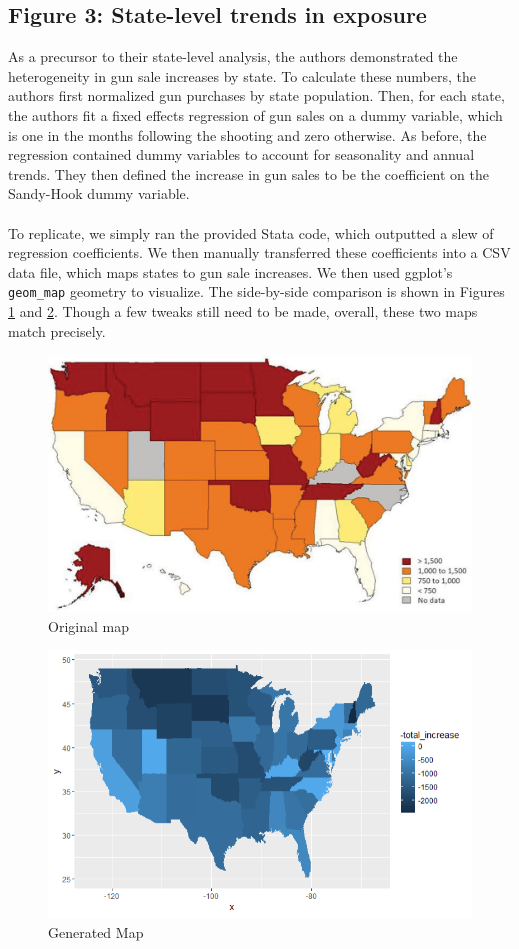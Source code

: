 \documentclass[12pt]{article}%
\begin{document}
\subsection*{Figure 3: State-level trends in exposure}
As a precursor to their state-level analysis, the authors demonstrated the heterogeneity in gun sale increases by state. To calculate these numbers, the authors first normalized gun purchases by state population. Then, for each state, the authors fit a fixed effects regression of gun sales on a dummy variable, which is one in the months following the shooting and zero otherwise. As before, the regression contained dummy variables to account for seasonality and annual trends. They then defined the increase in gun sales to be the coefficient on the Sandy-Hook dummy variable. \\ \\
To replicate, we simply ran the provided Stata code, which outputted a slew of regression coefficients. We then manually transferred these coefficients into a CSV data file, which maps states to gun sale increases. We then used ggplot's \texttt{geom\_map} geometry to visualize. The side-by-side comparison is shown in Figures \ref{fig:fig3_original} and \ref{fig:fig3_generated}. Though a few tweaks still need to be made, overall, these two maps match precisely. 
\begin{figure}[hbt]
	\centering
	\includegraphics[width=.75\linewidth]{figures/fig3_original.jpg}
	\caption{Original map}
	\label{fig:fig3_original}
\end{figure}
\begin{figure}[hbt]
	\centering
	\includegraphics[width=.9\linewidth]{figures/fig3_generated.png}
	\caption{Generated Map}
	\label{fig:fig3_generated}
\end{figure}
\end{document}
